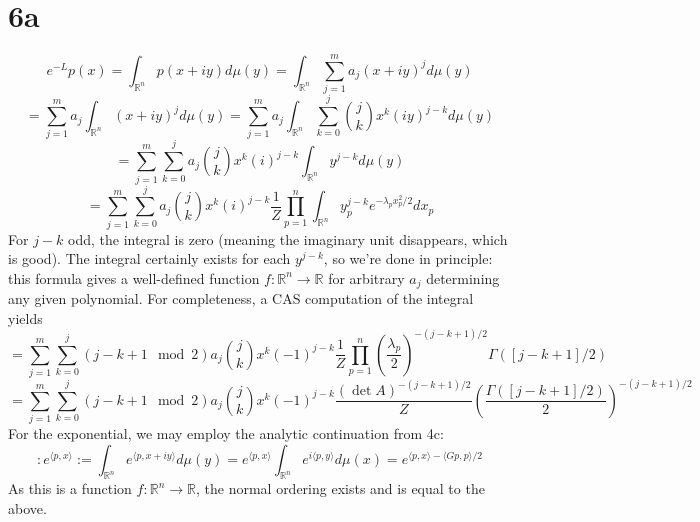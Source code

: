 \documentclass{article}
\begin{document}
\section*{6a}
\[
  e^{-L}p(x)=\int_{\mathbb{R}^{n}}p(x+iy)d\mu(y)
  =\int_{\mathbb{R}^{n}}\sum_{j=1}^{m}a_{j}(x+iy)^{j}d\mu(y)
\]
\[
  =\sum_{j=1}^{m}a_{j}\int_{\mathbb{R}^{n}}(x+iy)^{j}d\mu(y)
  =\sum_{j=1}^{m}a_{j}\int_{\mathbb{R}^{n}}\sum_{k=0}^{j}\binom{j}{k}x^{k}(iy)^{j-k}d\mu(y)
\]
\[
  =\sum_{j=1}^{m}\sum_{k=0}^{j}a_{j}\binom{j}{k}x^{k}(i)^{j-k}\int_{\mathbb{R}^{n}}y^{j-k}d\mu(y)
\]
\[
  =\sum_{j=1}^{m}\sum_{k=0}^{j}a_{j}\binom{j}{k}x^{k}(i)^{j-k}\frac{1}{Z}\prod_{p=1}^{n}\int_{\mathbb{R}^{n}}y_p^{j-k}e^{-\lambda_{p}x_{p}^{2}/2}dx_{p}
\]
For $j-k$ odd, the integral is zero (meaning the imaginary unit disappears, which is good).
The integral certainly exists for each $y^{j-k}$, so we're done in principle: this formula gives a well-defined function
$f:\mathbb{R}^{n}\to \mathbb{R}$ for arbitrary $a_{j}$ determining any given polynomial.
For completeness, a CAS computation of the integral yields
\[
  =\sum_{j=1}^{m}\sum_{k=0}^{j}(j-k+1\mod{2})a_{j}\binom{j}{k}x^{k}(-1)^{j-k}\frac{1}{Z}\prod_{p=1}^{n}\left( \frac{\lambda_{p}}{2} \right)^{-(j-k+1)/2}
  \Gamma([j-k+1]/2)
\]
\[
  =\sum_{j=1}^{m}\sum_{k=0}^{j}(j-k+1\mod{2})a_{j}\binom{j}{k}x^{k}(-1)^{j-k}\frac{(\det A)^{-(j-k+1)/2}}{Z}
  \left( \frac{\Gamma([j-k+1]/2)}{2} \right)^{-(j-k+1)/2}
\]
For the exponential, we may employ the analytic continuation from 4c:
\[
  :e^{\langle p,x \rangle}:=\int_{\mathbb{R}^{n}}e^{\langle p,x+iy\rangle}d\mu(y)
  =e^{\langle p,x \rangle}\int_{\mathbb{R}^{n}}e^{i\langle p,y  \rangle}d\mu(x)
  =e^{\langle p,x \rangle-\langle Gp,p \rangle/2}
\]
As this is a function $f:\mathbb{R}^{n}\to \mathbb{R}$, the normal ordering exists and is equal to the above.
\end{document}

